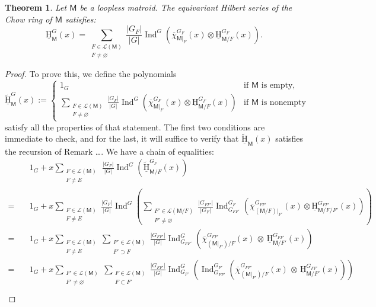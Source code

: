 \documentclass[11pt, a4paper, english]{amsart}
\theoremstyle{teoremas}
\newtheorem{theorem}{Theorem}[section]
\theoremstyle{definition}
\newcommand{\M}{\mathsf{M}}
\newcommand{\uH}{\underline{\mathrm{H}}}
\newcommand{\Ind}{\operatorname{Ind}}
\begin{document}
\begin{theorem}\label{thm:equiv-main-part2}
    Let $\M$ be a loopless matroid. The equivariant Hilbert series of the Chow ring of $\M$ satisfies:
        \[
        \uH_{\M}^G(x) = \sum_{\substack{F\in\mathcal{L}(\M)\\ F\neq\varnothing}} \frac{|G_F|}{|G|}\Ind^G\left(\overline{\chi}_{\M|_F}^{G_F}(x)\otimes \uH_{\M/F}^{G_F}(x)\right).\]
\end{theorem}
\begin{proof}
    To prove this, we define the polynomials
    \[ \widetilde{\uH}_{\M}^G(x) := 
    \begin{cases} 1_G & \text{if $\M$ is empty,}\\ \displaystyle\sum_{\substack{F\in\mathcal{L}(\M)\\ F\neq\varnothing}} \frac{|G_F|}{|G|}\Ind^G\left(\overline{\chi}_{\M|_F}^{G_F}(x)\otimes \uH_{\M/F}^{G_F}(x)\right) & \text{if $\M$ is nonempty}
    \end{cases}\]
    satisfy all the properties of that statement. The first two conditions are immediate to check, and for the last, it will suffice to verify that $\widetilde{\uH}_{\M}(x)$ satisfies the recursion of Remark \dots. We have a chain of equalities:
    \begin{align}
        &1_G + x\sum_{\substack{F\in\mathcal{L}(\M)\\ F\neq E}}\,\frac{|G_{F}|}{|G|}\Ind^G\left(\widetilde{\uH}_{\M/F}^{G_F}(x)\right)\nonumber\\ 
        =\quad &1_G + x\sum_{\substack{F\in \mathcal{L}(\M)\\F\neq E}}\frac{|G_{F}|}{|G|}\Ind^G\left(\sum_{\substack{F'\in \mathcal{L}(\M/F)\\F'\neq \varnothing}}\frac{|G_{FF'}|}{|G_F|}\Ind_{G_{FF'}}^{G_F}\left(\overline{\chi}_{(\M/F)|_{F'}}^{G_{FF'}}(x)\otimes \uH_{\M/F/F'}^{G_{FF'}}(x)\right)\right) \nonumber\\
        =\quad &1_G + x\sum_{\substack{F\in \mathcal{L}(\M)\\F\neq E}} \sum_{\substack{F'\in \mathcal{L}(\M)\\F'\supset F}} \frac{|G_{FF'}|}{|G|}\Ind_{G_{FF'}}^G\left(\overline{\chi}_{(\M|_{F'})/F}^{G_{FF'}}(x)\,\otimes\, \uH_{\M/F'}^{G_{FF'}}(x)\right)\nonumber\\
        =\quad &1_G + x\sum_{\substack{F'\in \mathcal{L}(\M)\\F'\neq \varnothing}} \sum_{\substack{F\in \mathcal{L}(\M)\\F\subset F'}} \frac{|G_{FF'}|}{|G|}\Ind_{G_{F'}}^G\left(\Ind_{G_{FF'}}^{G_{F'}}\left(\overline{\chi}_{(\M|_{F'})/F}^{G_{FF'}}(x)\,\otimes\, \uH_{\M/F'}^{G_{FF'}}(x)\right)\right)\nonumber\\

\end{align}
\end{proof}
\end{document}
